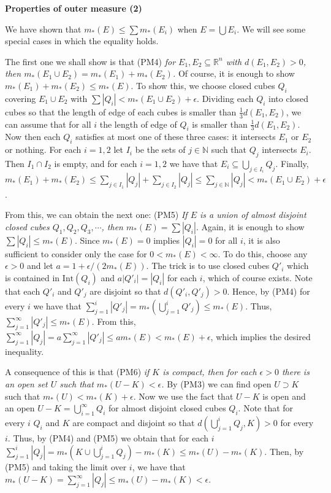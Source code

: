 \documentclass{article}
\newcommand{\NaN}{\mathbb{N}}
\newcommand{\ReR}{\mathbb{R}}
\begin{document}
\newpage

\textbf{Properties of outer measure (2)}

We have shown that $m_*(E) \le \sum m_*(E_i)$ when $E = \bigcup E_i$.
We will see some special cases in which the equality holds.

The first one we shall show is that (PM4) \textit{for $E_1, E_2 \subseteq \ReR^n$ with $d(E_1, E_2) > 0$, then $m_*(E_1 \cup E_2) = m_*(E_1) + m_*(E_2)$.}
Of course, it is enough to show $m_*(E_1) + m_*(E_2) \le m_*(E)$.
To show this, we choose closed cubes $Q_i$ covering $E_1 \cup E_2$ with $\sum |Q_i| < m_*(E_1 \cup E_2) + \epsilon$.
Dividing each $Q_i$ into closed cubes so that the length of edge of each cubes is smaller than $\frac{1}{3} d(E_1, E_2)$, we can assume that for all $i$ the length of edge of $Q_i$ is smaller than $\frac{1}{3} d(E_1, E_2)$.
Now then each $Q_i$ satisfies at most one of these three cases: it intersects $E_1$ or $E_2$ or nothing.
For each $i = 1, 2$ let $I_i$ be the sets of $j \in \NaN$ such that $Q_j$ intersects $E_i$.
Then $I_1 \cap I_2$ is empty, and for each $i = 1, 2$ we have that $E_i \subseteq \bigcup_{j \in I_i} Q_j$.
Finally, $m_*(E_1) + m_*(E_2) \le \sum_{j \in I_1} |Q_j| + \sum_{j \in I_2} |Q_j| \le \sum_{j \in \NaN} |Q_j| < m_*(E_1 \cup E_2) + \epsilon$.

From this, we can obtain the next one: (PM5) \textit{If $E$ is a union of almost disjoint closed cubes $Q_1, Q_2, Q_3, \cdots$, then $m_*(E) = \sum |Q_i|$}.
Again, it is enough to show $\sum |Q_i| \le m_*(E)$.
Since $m_*(E) = 0$ implies $|Q_i| = 0$ for all $i$, it is also sufficient to consider only the case for $0 < m_*(E) < \infty$.
To do this, choose any $\epsilon > 0$ and let $a = 1 + \epsilon / (2 m_*(E))$.
The trick is to use closed cubes $Q'_i$ which is contained in $\mathrm{Int}(Q_i)$ and $a|Q'_i| = |Q_i|$ for each $i$, which of course exists.
Note that each $Q'_i$ and $Q'_j$ are disjoint so that $d(Q'_i, Q'_j) > 0$.
Hence, by (PM4) for every $i$ we have that $\sum_{j = 1}^i |Q'_j| = m_*(\bigcup_{j = 1}^i Q'_j) \le m_*(E)$.
Thus, $\sum_{j = 1}^\infty |Q'_j| \le m_*(E)$.
From this, $\sum_{j = 1}^\infty |Q_j| = a\sum_{j = 1}^\infty |Q'_j| \le am_*(E) < m_*(E) + \epsilon$, which implies the desired inequality.

A consequence of this is that (PM6) \textit{if $K$ is compact, then for each $\epsilon > 0$ there is an open set $U$ such that $m_*(U - K) < \epsilon$.}
By (PM3) we can find open $U \supset K$ such that $m_*(U) < m_*(K) + \epsilon$.
Now we use the fact that $U - K$ is open and an open $U - K = \bigcup_{i = 1}^\infty Q_i$ for almost disjoint closed cubes $Q_i$.
Note that for every $i$ $Q_i$ and $K$ are compact and disjoint so that $d(\bigcup_{j = 1}^i Q_j, K) > 0$ for every $i$.
Thus, by (PM4) and (PM5) we obtain that for each $i$ $\sum_{j = 1}^i |Q_j| = m_*(K \cup \bigcup_{j = 1}^i Q_j) - m_*(K) \le m_*(U) - m_*(K)$.
Then, by (PM5) and taking the limit over $i$, we have that $m_*(U - K) = \sum_{j = 1}^\infty |Q_j| \le m_*(U) - m_*(K) < \epsilon$.
\end{document}
